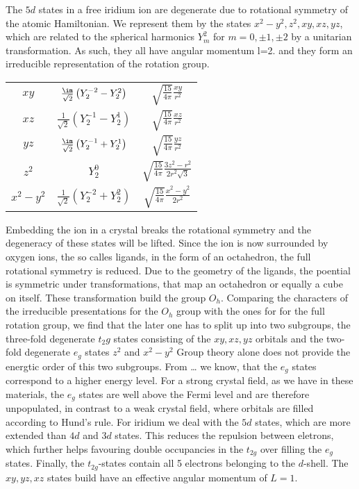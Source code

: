 \documentclass[a4paper,10pt]{report}
\begin{document}
The $5d$ states  in a free iridium ion are degenerate due to rotational symmetry of the atomic Hamiltonian. 
We represent them by the states $x^2-y^2,z^2,xy,xz,yz$, which are related to the spherical harmonics $Y^2_m$ for $m=0,\pm1,\pm2$ by a unitarian transformation.
As such, they all have angular momentum l=2. 
and they form an irreducible representation of the rotation group.
\begin{center}
\begin{tabular}{|c|c|c|}
 \hline
 $xy$ & $\frac{\im}{\sqrt 2} \left( Y^{-2}_2 - Y^2_2 \right)$ & $\sqrt{\frac{15}{4\pi}} \frac{xy}{r^2}$ \\
 $xz$ & $\frac{  1}{\sqrt 2} \left( Y^{-1}_2 - Y^1_2 \right)$ & $\sqrt{\frac{15}{4\pi}} \frac{xz}{r^2}$ \\
 $yz$ & $\frac{\im}{\sqrt 2} \left( Y^{-1}_2 + Y^1_2 \right)$ & $\sqrt{\frac{15}{4\pi}} \frac{yz}{r^2}$ \\
 $z^2$& $ Y^0_{2} 					      $	& $\sqrt{\frac{15}{4\pi}} \frac{3z^2-r^2}{2r^2\sqrt 3} $\\
 $x^2-y^2$&$\frac1{\sqrt 2} \left( Y^{-2}_2 + Y^2_2 \right) $ & $\sqrt{\frac{15}{4\pi}} \frac{x^2-y^2}{2r^2} $ \\
 \hline
\end{tabular}
\end{center}
%
Embedding the ion in a crystal breaks the rotational symmetry and the degeneracy of these states will be lifted.
Since the ion is now surrounded by oxygen ions, the so calles ligands, in the form of an octahedron, the 
full rotational symmetry is reduced.
Due to the geometry of the ligands, the poential is symmetric under transformations, that map an octahedron or equally a cube on itself.
These transformation build the group $O_h$.
Comparing the characters of the irreducible presentations for the $O_h$ group with the ones for for the full rotation group, we find that 
the later one has to split up into two subgroups, 
the three-fold degenerate $t_2g$ states consisting of the $xy,xz,yz$ orbitals and the two-fold degenerate $e_g$ states $z^2$ and $x^2-y^2$ \cite[p.70 et sqq.]{Tinkham64} 
Group theory alone does not provide the energtic order of this two subgroups. 
From …  we know, that the $e_g$ states correspond to a higher energy level.
For a strong crystal field, as we have in these materials, the $e_g$ states are well above the Fermi level and are therefore unpopulated,
in contrast to a weak crystal field, where orbitals are filled according to Hund's rule. 
For iridium we deal with the $5d$ states, which are more extended than $4d$ and $3d$ states. 
This reduces the repulsion between eletrons, which further helps favouring double occupancies in the $t_{2g}$ over filling the $e_g$ states.
Finally, the $t_{2g}$-states contain all 5 electrons belonging to the $d$-shell.
The $xy,yz,xz$ states build have an effective angular momentum of $L=1$.
\end{document}
